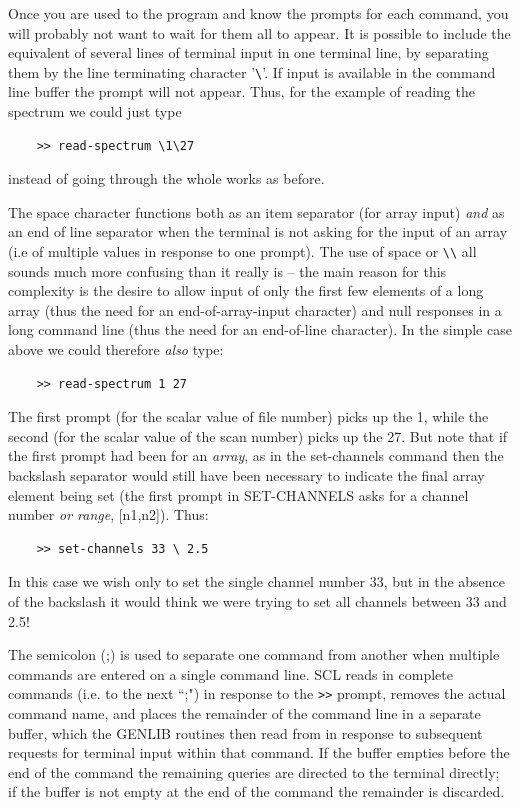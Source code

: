 \documentclass[11pt,twoside]{report}
\begin{document}
Once you are used to the program and know the prompts for each
command, you will probably not want to wait for them all to appear. It
is possible to include the equivalent of several lines of terminal
input in one terminal line, by separating them by the line terminating
character '\verb+\+'. If input is available in the
command line buffer the prompt will not appear. Thus, for the example
of reading the spectrum we could just type
\begin{verbatim}
    >> read-spectrum \1\27
\end{verbatim}
instead of going through the whole works as before.

The space character functions both as an item
separator (for array input) {\em and} as an end of line separator when
the terminal is not asking for the input of an array (i.e of multiple
values in response to one prompt).  The use of space or \verb+\\+ all
sounds much more confusing than it really is -- the main reason for
this complexity is the desire to allow input of only the first few
elements of a long array (thus the need for an end-of-array-input
character) and null responses in a long command
line (thus the need for an end-of-line character). In the simple case
above we could therefore {\em also} type:
\begin{verbatim}
    >> read-spectrum 1 27
\end{verbatim}
The first prompt (for the scalar value of file number) picks up the 1,
while the second (for the scalar value of the scan number) picks up
the 27. But note that if the first prompt had been for an {\em array},
as in the set-channels command then the backslash
separator would still have been necessary to indicate the final array
element being set (the first prompt in SET-CHANNELS asks for a channel
number {\em or range}, [n1,n2]). Thus:
\begin{verbatim}
    >> set-channels 33 \ 2.5
\end{verbatim}
In this case we wish only to set the single channel number 33, but in
the absence of the backslash it would think we were trying to set all
channels between 33 and 2.5!

The semicolon\index{;} (;) is used to separate one
command from another when multiple commands are entered on a single
command line.  SCL reads in complete commands (i.e. to the
next ``;") in response to the \verb+>>+ prompt, removes the actual
command name, and places the remainder of the command line in a
separate buffer, which the GENLIB
routines then read from in response to subsequent requests for
terminal input within that command. If the buffer empties before the
end of the command the remaining queries are directed to the terminal
directly; if the buffer is not empty at the end of the command the
remainder is discarded.
\end{document}
